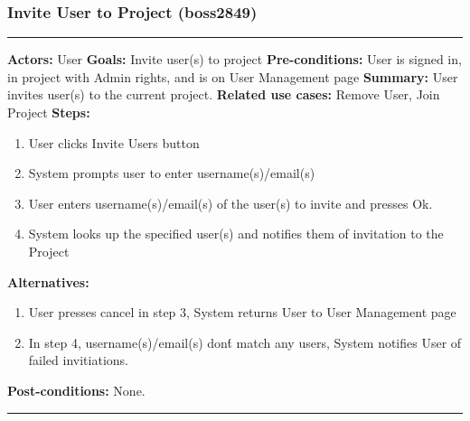 \documentclass[11pt]{report}
\begin{document}
\subsubsection{Invite User to Project  (boss2849)}
\vspace{2pt}
\hrule
\vspace{8pt}
 \textbf{Actors:} User \newline
\textbf{Goals:} Invite user(s) to project \newline
 \textbf{Pre-conditions:} User is signed in, in project with Admin rights, and is on User Management page \newline
 \textbf{Summary:} User invites user(s) to the current project. \newline
\textbf{Related use cases:} Remove User, Join Project \newline
\textbf{Steps:} \begin{enumerate}
  \item User clicks Invite Users button
  \item System prompts user to enter username(s)/email(s)
  \item User enters username(s)/email(s) of the user(s) to invite and presses Ok.
  \item System looks up the specified user(s) and notifies them of invitation to the Project
 \end{enumerate}
 \textbf{Alternatives:} \begin{enumerate}
  \item User presses cancel in step 3, System returns User to User Management page
  \item In step 4, username(s)/email(s) don\'t match any users, System notifies User of failed invitiations.
 \end{enumerate}
 \textbf{Post-conditions:} None. \newline
\vspace{8pt}
\hrule
\newpage
\end{document}
